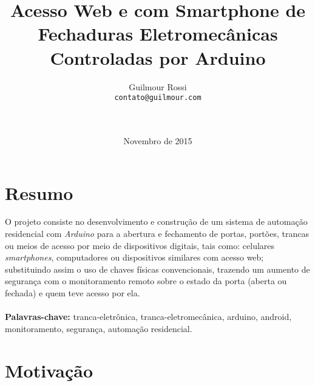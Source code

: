\documentclass[a4paper,12pt]{article}
\begin{document}
\title{Acesso Web e com Smartphone de Fechaduras Eletromecânicas Controladas por Arduino}
\author{Guilmour Rossi\\\texttt{contato@guilmour.com}\\\\\\
}

\date{Novembro de 2015}

\maketitle




\newpage


\tableofcontents


\newpage


\section{Resumo}
  O projeto consiste no desenvolvimento e construção de um sistema de automação residencial com \textit{Arduino} para a abertura e fechamento de portas, portões, trancas ou meios de acesso por meio de dispositivos digitais, tais como: celulares \textit{smartphones}, computadores ou dispositivos similares com acesso web; substituindo assim o uso de chaves físicas convencionais, trazendo um aumento de segurança com o monitoramento remoto sobre o estado da porta (aberta ou fechada) e quem teve acesso por ela.
  \textbf{\\\\Palavras-chave:} tranca-eletrônica, tranca-eletromecânica, arduino, android, monitoramento, segurança, automação residencial.


\newpage

\section{Motivação}
\end{document}
